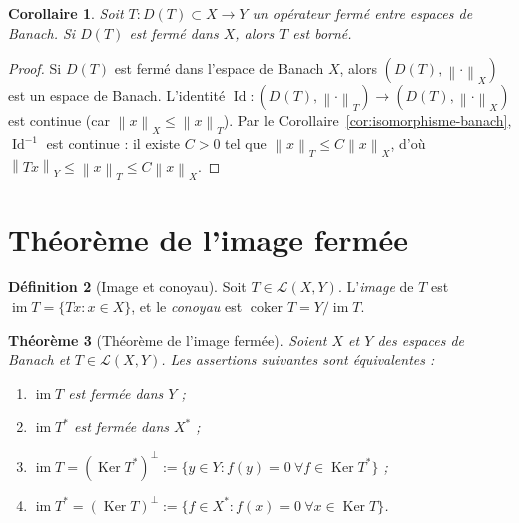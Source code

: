 \documentclass[a4paper,12pt]{book}
\DeclareMathOperator{\im}{im}
\DeclareMathOperator{\Id}{Id}
\DeclareMathOperator{\Ker}{Ker}
\DeclareMathOperator{\coker}{coker}
\newcommand{\norm}[1]{\left\| #1 \right\|}
\theoremstyle{definition}
\newtheorem{definition}{Définition}[chapter]
\theoremstyle{plain}
\newtheorem{theoreme}[definition]{Théorème}
\newtheorem{corollaire}[definition]{Corollaire}
\theoremstyle{remark}
\begin{document}
\begin{corollaire}
\label{cor:domaine-ferme-borne}
Soit $T : D(T) \subset X \to Y$ un opérateur fermé entre espaces de Banach.
Si $D(T)$ est fermé dans $X$, alors $T$ est borné.
\end{corollaire}

\begin{proof}
Si $D(T)$ est fermé dans l'espace de Banach $X$, alors $(D(T), \norm{\cdot}_X)$
est un espace de Banach. L'identité $\Id : (D(T), \norm{\cdot}_T) \to (D(T), \norm{\cdot}_X)$
est continue (car $\norm{x}_X \leq \norm{x}_T$). Par le
Corollaire~\ref{cor:isomorphisme-banach}, $\Id^{-1}$ est continue :
il existe $C > 0$ tel que $\norm{x}_T \leq C \norm{x}_X$, d'où
$\norm{Tx}_Y \leq \norm{x}_T \leq C \norm{x}_X$.
\end{proof}


\section{Théorème de l'image fermée}
\label{sec:image-fermee}


\begin{definition}[Image et conoyau]
\label{def:image-conoyau}
Soit $T \in \mathcal{L}(X,Y)$. L'\emph{image} de $T$ est
$\im T = \{Tx : x \in X\}$, et le \emph{conoyau} est
$\coker T = Y / \im T$.
\end{definition}

\begin{theoreme}[Théorème de l'image fermée]
\label{thm:image-fermee}
Soient $X$ et $Y$ des espaces de Banach et $T \in \mathcal{L}(X,Y)$.
Les assertions suivantes sont équivalentes :
\begin{enumerate}[label=(\roman*)]
  \item $\im T$ est fermée dans $Y$ ;
  \item $\im T^*$ est fermée dans $X^*$ ;
  \item $\im T = (\Ker T^*)^\perp := \{y \in Y : f(y) = 0\ \forall f \in \Ker T^*\}$ ;
  \item $\im T^* = (\Ker T)^\perp := \{f \in X^* : f(x) = 0\ \forall x \in \Ker T\}$.
\end{enumerate}
\end{theoreme}
\end{document}
